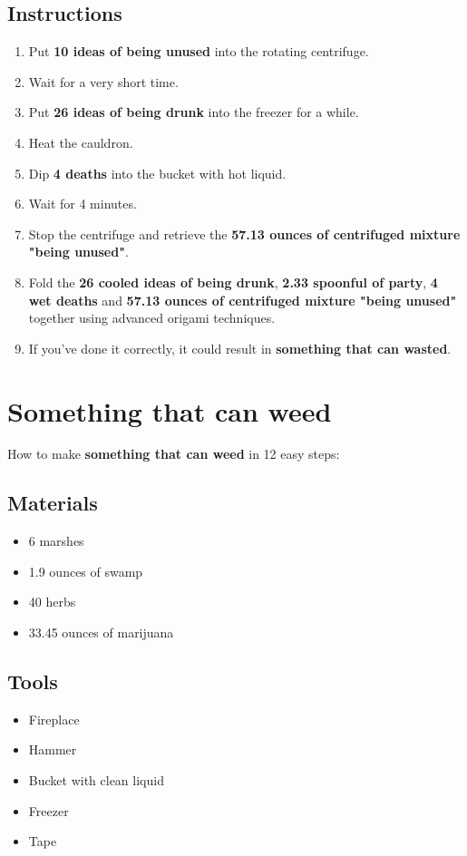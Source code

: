 \documentclass{article}
\begin{document}
\subsection{Instructions}\begin{enumerate}
\item 
Put \textbf{10 ideas of being unused} into the rotating centrifuge.
\item 
Wait for a very short time.
\item 
Put \textbf{26 ideas of being drunk} into the freezer for a while.
\item 
Heat the cauldron.
\item 
Dip \textbf{4 deaths} into the bucket with hot liquid.
\item 
Wait for 4 minutes.
\item 
Stop the centrifuge and retrieve the \textbf{57.13 ounces of centrifuged mixture "being unused"}.
\item 
Fold the \textbf{26 cooled ideas of being drunk}, \textbf{2.33 spoonful of party}, \textbf{4 wet deaths} and \textbf{57.13 ounces of centrifuged mixture "being unused"} together using advanced origami techniques.
\item 
If you've done it correctly, it could result in \textbf{something that can wasted}.
\end{enumerate}
\newpage
\section{Something that can weed}How to make \textbf{something that can weed} in 12 easy steps:

\subsection{Materials}\begin{itemize}
\item 
6 marshes
\item 
1.9 ounces of swamp
\item 
40 herbs
\item 
33.45 ounces of marijuana
\end{itemize}
\subsection{Tools}\begin{itemize}
\item 
Fireplace
\item 
Hammer
\item 
Bucket with clean liquid
\item 
Freezer
\item 
Tape
\end{itemize}
\end{document}
